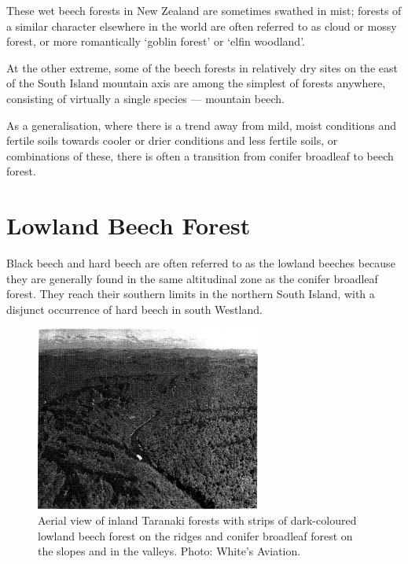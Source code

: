 These wet beech forests in New Zealand are sometimes swathed in mist; forests of a similar character elsewhere in the world are often referred to as cloud or mossy forest, or more romantically `goblin forest' or `elfin woodland'.

At the other extreme, some of the beech forests in relatively dry sites on the east of the South Island mountain axis are among the simplest of forests anywhere, consisting of virtually a single species --- mountain beech.

As a generalisation, where there is a trend away from mild, moist conditions and fertile soils towards cooler or drier conditions and less fertile soils, or combinations of these, there is often a transition from conifer broadleaf to beech forest.

\section{Lowland Beech Forest}

Black beech and hard beech are often referred to as the lowland beeches because they are generally found in the same altitudinal zone as the conifer broadleaf forest.
They reach their southern limits in the northern South Island, with a disjunct occurrence of hard beech in south Westland.

\begin{figure}
	\includegraphics[width=0.66\textwidth]{graphics/figure73taranaki-forests.jpg}
	\centering
	\caption[Aerial view of inland Taranaki forests]{Aerial view of inland Taranaki forests with strips of dark-coloured lowland beech forest on the ridges and conifer broadleaf forest on the slopes and in the valleys.
	Photo: White's Aviation.}%
	\label{fig:73taranaki-forests}
\end{figure}

